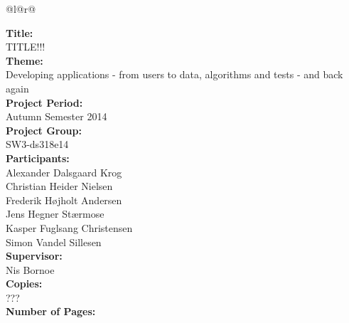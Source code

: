 \pagestyle{titlepagestyleeng}

\begin{nopagebreak}
{\begin{center}
    \begin{tabular*}{\textwidth}{@{}l@{\extracolsep{\fill}}r@{}}
        \\
        \begin{minipage}[t]{0.49\textwidth}
            \textbf{Title:}\\
            TITLE!!!\\

            \textbf{Theme:}\\
            Developing applications - from users to data, algorithms and tests - and back again\\

            \textbf{Project Period:}\\
            Autumn Semester 2014\\

            \textbf{Project Group:}\\
            SW3-ds318e14\\

            \textbf{Participants:}\\
            Alexander Dalsgaard Krog\\
            Christian Heider Nielsen\\
            Frederik Højholt Andersen\\
            Jens Hegner Stærmose\\
            Kasper Fuglsang Christensen\\
            Simon Vandel Sillesen\\

            \textbf{Supervisor:}\\
            Nis Bornoe\\

            \textbf{Copies:}\\
            ???\\

            \textbf{Number of Pages:}\\
            \pageref{LastPage}\\ 


\end{minipage}
\end{tabular*}
\end{center}}
\end{nopagebreak}
